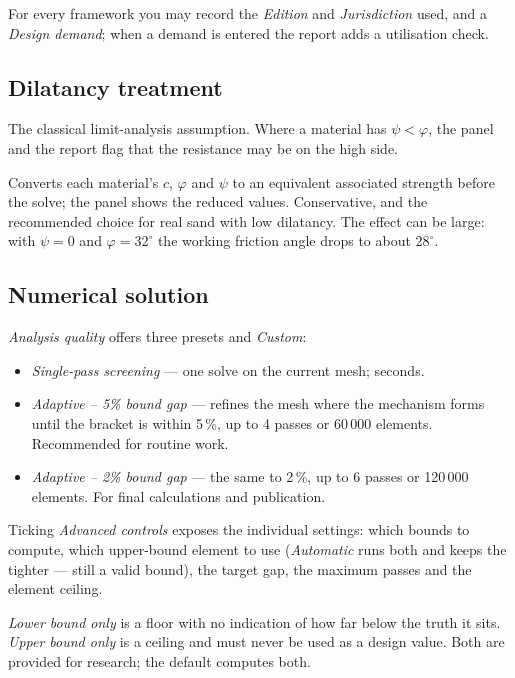 \documentclass[11pt,a4paper]{article}
\newcommand{\field}[1]{\textsf{\textit{#1}}}
\begin{document}
For every framework you may record the \field{Edition} and \field{Jurisdiction} used, and a \field{Design demand}; when a demand is entered the report adds a utilisation check.

\subsection{Dilatancy treatment}\label{sec:dilatancy}
\begin{description}[style=nextline]
  \item[Associated flow ($\psi = \varphi$)] The classical limit-analysis assumption. Where a material has $\psi < \varphi$, the panel and the report flag that the resistance may be on the high side.
  \item[Davis equivalent-strength reduction] Converts each material's $c$, $\varphi$ and $\psi$ to an equivalent associated strength before the solve; the panel shows the reduced values. Conservative, and the recommended choice for real sand with low dilatancy. The effect can be large: with $\psi = 0$ and $\varphi = 32^\circ$ the working friction angle drops to about $28^\circ$.
\end{description}

\subsection{Numerical solution}\label{sec:numerical}
\field{Analysis quality} offers three presets and \field{Custom}:
\begin{itemize}
  \item \field{Single-pass screening} --- one solve on the current mesh; seconds.
  \item \field{Adaptive -- 5\% bound gap} --- refines the mesh where the mechanism forms until the bracket is within 5\,\%, up to 4 passes or 60\,000 elements. Recommended for routine work.
  \item \field{Adaptive -- 2\% bound gap} --- the same to 2\,\%, up to 6 passes or 120\,000 elements. For final calculations and publication.
\end{itemize}
Ticking \field{Advanced controls} exposes the individual settings: which bounds to compute, which upper-bound element to use (\field{Automatic} runs both and keeps the tighter --- still a valid bound), the target gap, the maximum passes and the element ceiling.

\begin{caution}
\field{Lower bound only} is a floor with no indication of how far below the truth it sits. \field{Upper bound only} is a ceiling and must never be used as a design value. Both are provided for research; the default computes both.
\end{caution}
\end{document}
